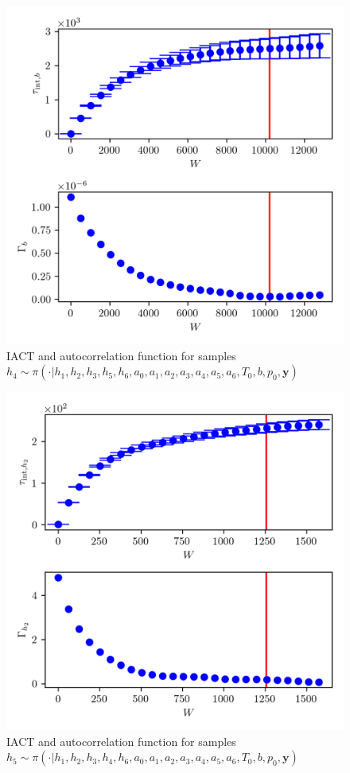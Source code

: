\begin{figure}[ht!]
	\centering
	\includegraphics{UwerrTauIntTWalk3.png}
	\caption[IACT and autocorrelation function for $h_4$ samples.]{IACT and autocorrelation function for samples $h_4 \sim \pi( \cdot | h_1,h_2,h_3,h_5,h_6,a_0,a_1,a_2,a_3,a_4,a_5,a_6,T_0,b,p_0, \bm{y})$}
	\label{fig:}
\end{figure}


\begin{figure}[ht!]
	\centering
	\includegraphics{UwerrTauIntTWalk4.png}
	\caption[IACT and autocorrelation function for $h_5$ samples.]{IACT and autocorrelation function for samples $h_5 \sim \pi( \cdot | h_1, h_2,h_3,h_4,h_6,a_0,a_1,a_2,a_3,a_4,a_5,a_6,T_0,b,p_0,  \bm{y})$}
	\label{fig:}
\end{figure}


